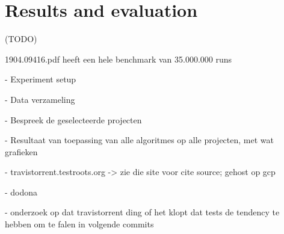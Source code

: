 \chapter{Results and evaluation}\label{chap:results}
(TODO)

1904.09416.pdf heeft een hele benchmark van 35.000.000 runs

- Experiment setup

  -  Data verzameling

  - Bespreek de geselecteerde projecten
  
- Resultaat van toepassing van alle algoritmes op alle projecten, met wat grafieken

- travistorrent.testroots.org -> zie die site voor cite source; gehost op gcp

- dodona

- onderzoek op dat travistorrent ding of het klopt dat tests de tendency te hebben om te falen in volgende commits
